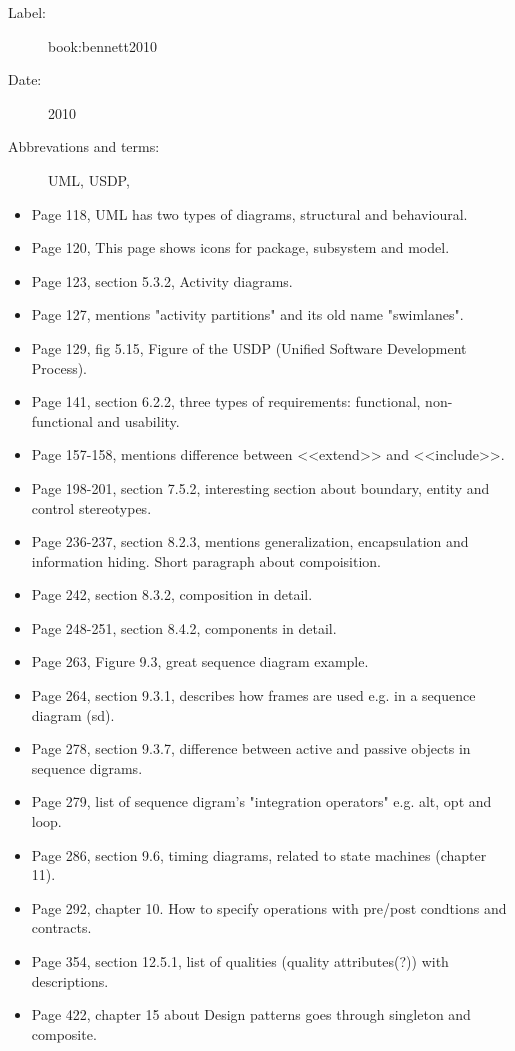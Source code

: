 \begin{description}
    \item[Label:] book:bennett2010 \cite{book:bennett2010}
    \item[Date:] 2010
    \item[Abbrevations and terms:]
        UML,
        USDP,
\end{description}


\begin{itemize}
    \item Page 118, UML has two types of diagrams, structural and behavioural.
    \item Page 120, This page shows icons for package, subsystem and model.
    \item Page 123, section 5.3.2, Activity diagrams.
    \item Page 127, mentions "activity partitions" and its old name
        "swimlanes".
    \item Page 129, fig 5.15, Figure of the USDP (Unified Software Development
        Process).
    \item Page 141, section 6.2.2, three types of requirements: functional,
        non-functional and usability.
    \item Page 157-158, mentions difference between <<extend>> and <<include>>.
    \item Page 198-201, section 7.5.2, interesting section about boundary,
        entity and control stereotypes.
    \item Page 236-237, section 8.2.3, mentions generalization, encapsulation
        and information hiding. Short paragraph about compoisition.
    \item Page 242, section 8.3.2, composition in detail.
    \item Page 248-251, section 8.4.2, components in detail.
    \item Page 263, Figure 9.3, great sequence diagram example.
    \item Page 264, section 9.3.1, describes how frames are used e.g. in a
        sequence diagram (sd).
    \item Page 278, section 9.3.7, difference between active and passive
        objects in sequence digrams.
    \item Page 279, list of sequence digram's "integration operators" e.g. alt,
        opt and loop.
    \item Page 286, section 9.6, timing diagrams, related to state machines
        (chapter 11).
    \item Page 292, chapter 10. How to specify operations with pre/post
        condtions and contracts.
    \item Page 354, section 12.5.1, list of qualities (quality attributes(?))
        with descriptions.
    \item Page 422, chapter 15 about Design patterns goes through singleton and
        composite.
\end{itemize}

